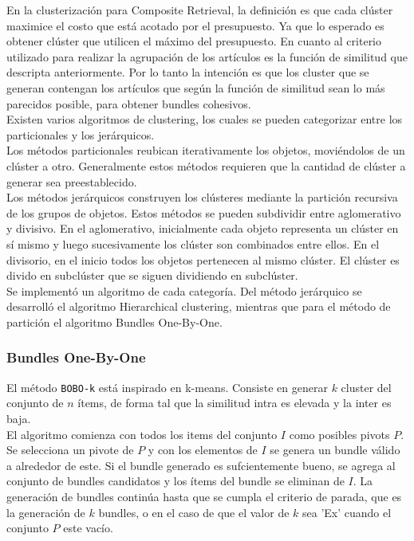 En la clusterización para Composite Retrieval, la definición es que cada clúster maximice el costo que está acotado por el presupuesto. Ya que lo esperado es obtener clúster que utilicen el máximo del presupuesto. En cuanto al criterio utilizado para realizar la agrupación de los artículos es la función de similitud que descripta anteriormente. Por lo tanto la intención es que los cluster que se generan contengan los artículos que según la función de similitud sean lo más parecidos posible, para obtener bundles cohesivos.\\
Existen varios algoritmos de clustering, los cuales se pueden categorizar entre los particionales y los jerárquicos.\\
Los métodos particionales reubican iterativamente los objetos, moviéndolos de un clúster a otro. Generalmente estos métodos requieren que la cantidad de clúster a generar sea preestablecido.\\
Los métodos jerárquicos construyen los clústeres mediante la partición recursiva de los grupos de objetos. Estos métodos se pueden subdividir entre aglomerativo y divisivo. En el aglomerativo, inicialmente cada objeto representa un clúster en sí mismo y luego sucesivamente los clúster son combinados entre ellos. En el divisorio, en el inicio todos los objetos pertenecen al mismo clúster. El clúster es divido en subclúster que se siguen dividiendo en subclúster.\\
Se implementó un algoritmo de cada categoría. Del método jerárquico se desarrolló el algoritmo Hierarchical clustering, mientras que para el método de partición el algoritmo Bundles One-By-One.\\


\subsubsection{Bundles One-By-One}
El método \texttt{BOBO-k} está inspirado en k-means. Consiste en generar $k$ cluster del conjunto de $n$ ítems, de forma tal que la similitud intra es elevada y la inter es baja.\\
El algoritmo comienza con todos los items del conjunto $I$ como posibles pivots $P$. Se selecciona un pivote de $P$ y con los elementos de $I$ se genera un bundle válido a alrededor de este. Si el bundle generado es sufcientemente bueno, se agrega al conjunto de bundles candidatos y los ítems del bundle se eliminan de $I$. La generación de bundles continúa hasta que se cumpla el criterio de parada, que es la generación de $k$ bundles, o en el caso de que el valor de $k$ sea 'Ex' cuando el conjunto $P$ este vacío.\\

